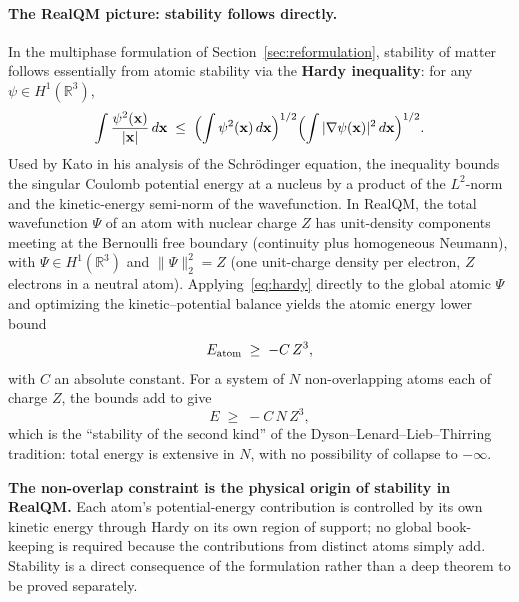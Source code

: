 \documentclass[11pt]{article}
\begin{document}
\paragraph{The RealQM picture: stability follows directly.}
In the multiphase formulation of Section~\ref{sec:reformulation}, stability of matter follows essentially from atomic stability via the \textbf{Hardy inequality}: for any $\psi \in H^1(\mathbb{R}^3)$,
\begin{equation}\label{eq:hardy}
\int \frac{\psi^2(\mathbf{x})}{|\mathbf{x}|} \, d\mathbf{x}
\;\le\;
\Bigl(\int \psi^2(\mathbf{x}) \, d\mathbf{x}\Bigr)^{1/2}
\Bigl(\int |\nabla \psi(\mathbf{x})|^2 \, d\mathbf{x}\Bigr)^{1/2}.
\end{equation}
Used by Kato in his analysis of the Schr\"odinger equation, the inequality bounds the singular Coulomb potential energy at a nucleus by a product of the $L^2$-norm and the kinetic-energy semi-norm of the wavefunction. In RealQM, the total wavefunction $\Psi$ of an atom with nuclear charge $Z$ has unit-density components meeting at the Bernoulli free boundary (continuity plus homogeneous Neumann), with $\Psi \in H^1(\mathbb{R}^3)$ and $\|\Psi\|_2^2 = Z$ (one unit-charge density per electron, $Z$ electrons in a neutral atom). Applying~\eqref{eq:hardy} directly to the global atomic $\Psi$ and optimizing the kinetic--potential balance yields the atomic energy lower bound
\begin{equation}\label{eq:atom-bound}
E_{\rm atom} \;\ge\; -C\, Z^3,
\end{equation}
with $C$ an absolute constant. For a system of $N$ non-overlapping atoms each of charge $Z$, the bounds add to give
\begin{equation}\label{eq:bulk-bound}
E \;\ge\; -C\, N\, Z^3,
\end{equation}
which is the ``stability of the second kind'' of the Dyson--Lenard--Lieb--Thirring tradition: total energy is extensive in $N$, with no possibility of collapse to $-\infty$.

\textbf{The non-overlap constraint is the physical origin of stability in RealQM.} Each atom's potential-energy contribution is controlled by its own kinetic energy through Hardy on its own region of support; no global book-keeping is required because the contributions from distinct atoms simply add. Stability is a direct consequence of the formulation rather than a deep theorem to be proved separately.
\end{document}
